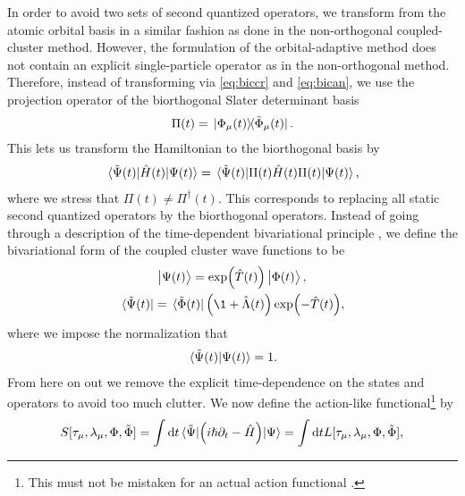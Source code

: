             In order to avoid two sets of second quantized operators, we
            transform from the atomic orbital basis in a similar fashion as done
            in the non-orthogonal coupled-cluster method.
            However, the formulation of the orbital-adaptive method does not
            contain an explicit single-particle operator as in the
            non-orthogonal method.
            Therefore, instead of transforming via \autoref{eq:biccr} and
            \autoref{eq:bican}, we use the projection operator of the
            biorthogonal Slater determinant basis \cite{kvaal2012ab}
            \begin{align}
                \Pi(t)
                = \dyad*{\slat_{\mu}(t)}{\tilde{\slat}_{\mu}(t)}.
            \end{align}
            This lets us transform the Hamiltonian to the biorthogonal basis by
            \begin{align}
                \mel*{\tilde{\Psi}(t)}{\hat{H}(t)}{\Psi(t)}
                =
                \mel*{\tilde{\Psi}(t)}{\Pi(t)\hat{H}(t)\Pi(t)}{\Psi(t)},
            \end{align}
            where we stress that $\Pi(t) \neq \Pi^{\dagger}(t)$.  This
            corresponds to replacing all static second quantized operators by
            the biorthogonal operators.
            Instead of going through a description of the time-dependent
            bivariational principle \cite{kvaal2012ab, arponen1983311}, we
            define the bivariational form of the coupled cluster wave functions
            to be
            \begin{gather}
                \ket{\Psi(t)} = \exp(\clust(t))\ket{\slat(t)}, \\
                \bra*{\tilde{\Psi}(t)}
                = \bra*{\tilde{\slat}(t)}\para{\1 + \clustl(t)}
                \exp(-\clust(t)),
            \end{gather}
            where we impose the normalization that
            \begin{align}
                \braket*{\tilde{\Psi}(t)}{\Psi(t)} = 1.
            \end{align}
            From here on out we remove the explicit time-dependence on the
            states and operators to avoid too much clutter.
            We now define the action-like functional\footnote{%
                This must not be mistaken for an actual action functional
                \cite{arponen1983311}.
            } by \cite{kvaal2012ab, arponen1983311}
            \begin{align}
                S[\tau_{\mu}, \lambda_{\mu}, \Phi, \tilde{\Phi}]
                =
                \int \dd t
                \mel*{\tilde{\Psi}}{
                    \left( 
                        i\hslash\partial_t - \hat{H}
                     \right)
                }{\Psi}
                =
                \int \dd t
                L[\tau_{\mu}, \lambda_{\mu}, \Phi, \tilde{\Phi}],
                \label{eq:oacc-action-functional}
            \end{align}
